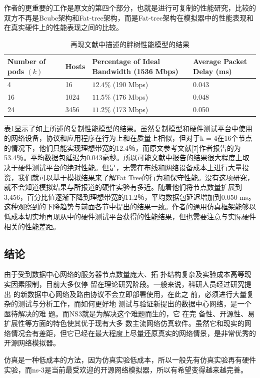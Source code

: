 \documentclass[lang=cn,11pt,a4paper,cite=authoryear]{elegantpaper}
\begin{document}
作者的更重要的工作是原文的第四个部分，也就是进行可复制的性能研究，比较的双方不再是Bcube架构和Fat-tree架构，而是Fat-tree架构在模拟器中的性能表现和在真实硬件上的性能表现之间的比较。
\begin{table}[htbp]
	\centering
\begin{tabular}{|l|l|l|l|}
	\hline Number of pods $(k)$ & Hosts & Percentage of Ideal Bandwidth (1536 Mbps) & Average Packet Delay (ms) \\
	\hline 4 & 16 & $12.4 \%$ (190 Mbps) & 0.043 \\
	\hline 16 & 1024 & $11.5 \%$ (176 Mbps) & 0.048 \\
	\hline 24 & 3456 & $11.2 \%$ (173 Mbps) & 0.050 \\
	\hline
\end{tabular}
\caption{再现文献中描述的胖树性能模型的结果}
\label{table:fatfattree}
\end{table}

表\ref{table:fatfattree}显示了如上所述的复制性能模型的结果。虽然复制模型和硬件测试平台中使用的网络设备，协议和应用程序在行为上和在质量上相似，但对于k = 4在16个节点的情况下，他们只能实现理想带宽的12.4％，而原文参考文献[7]作者报告的为53.4％。平均数据包延迟为0.043毫秒。所以可能文献中报告的结果很大程度上取决于硬件测试平台的绝对性能。但是，无需在布线和网络设备成本上进行大量投资，我们就可以基于模拟结果来了解Fat Tree的行为和保守性能。没有这项研究，就不会知道模拟结果与所报道的硬件实验有多近。随着他们将节点数量扩展到3,456，百分比值逐渐下降到理想带宽的11.2％，平均数据包延迟增加到0.050 ms。这种观察到的下降趋势与前面各节中提出的结果一致。作者的通用仿真框架能够以低成本切实地再现从中的硬件测试平台获得的性能结果，但也需要注意与实际硬件相关的性能差距。

\subsection{结论}
由于受到数据中心网络的服务器节点数量庞大、拓
扑结构复杂及实验成本高等现实因素限制，目前大多仅停
留在理论研究阶段。一般来说，科研人员经过研究提出
的新数据中心网络及路由协议不会立即部署使用，在此之
前，必须进行大量复杂的测试与分析工作，而如何更好地
测试与验证新提出的数据中心网络，是一个亟待解决的难
题。而NS3就是为解决这个难题而生的，它 在完
备性、开源性、易扩展性等方面的特色使其优于现有大多
数主流网络仿真软件。虽然它和现实的网络情况会有差距，但它已经在最大程度上尽量还原真实的网络情景，是非常优秀的开源网络模拟器。

仿真是一种低成本的方法，因为仿真实验低成本，所以一般先有仿真实验再有硬件实验，而ns-3是当前最受欢迎的开源网络模拟器，所以有希望变得越来越完善。
\end{document}
